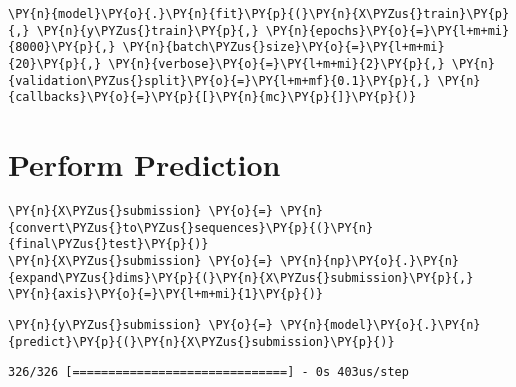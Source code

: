     \begin{tcolorbox}[breakable, size=fbox, boxrule=1pt, pad at break*=1mm,colback=cellbackground, colframe=cellborder]
\begin{Verbatim}[commandchars=\\\{\}]
\PY{n}{model}\PY{o}{.}\PY{n}{fit}\PY{p}{(}\PY{n}{X\PYZus{}train}\PY{p}{,} \PY{n}{y\PYZus{}train}\PY{p}{,} \PY{n}{epochs}\PY{o}{=}\PY{l+m+mi}{8000}\PY{p}{,} \PY{n}{batch\PYZus{}size}\PY{o}{=}\PY{l+m+mi}{20}\PY{p}{,} \PY{n}{verbose}\PY{o}{=}\PY{l+m+mi}{2}\PY{p}{,} \PY{n}{validation\PYZus{}split}\PY{o}{=}\PY{l+m+mf}{0.1}\PY{p}{,} \PY{n}{callbacks}\PY{o}{=}\PY{p}{[}\PY{n}{mc}\PY{p}{]}\PY{p}{)}
\end{Verbatim}
\end{tcolorbox}
        
    \hypertarget{perform-prediction}{%
\section{Perform Prediction}\label{perform-prediction}}

    \begin{tcolorbox}[breakable, size=fbox, boxrule=1pt, pad at break*=1mm,colback=cellbackground, colframe=cellborder]
\begin{Verbatim}[commandchars=\\\{\}]
\PY{n}{X\PYZus{}submission} \PY{o}{=} \PY{n}{convert\PYZus{}to\PYZus{}sequences}\PY{p}{(}\PY{n}{final\PYZus{}test}\PY{p}{)}
\PY{n}{X\PYZus{}submission} \PY{o}{=} \PY{n}{np}\PY{o}{.}\PY{n}{expand\PYZus{}dims}\PY{p}{(}\PY{n}{X\PYZus{}submission}\PY{p}{,} \PY{n}{axis}\PY{o}{=}\PY{l+m+mi}{1}\PY{p}{)}
\end{Verbatim}
\end{tcolorbox}

    \begin{tcolorbox}[breakable, size=fbox, boxrule=1pt, pad at break*=1mm,colback=cellbackground, colframe=cellborder]
\begin{Verbatim}[commandchars=\\\{\}]
\PY{n}{y\PYZus{}submission} \PY{o}{=} \PY{n}{model}\PY{o}{.}\PY{n}{predict}\PY{p}{(}\PY{n}{X\PYZus{}submission}\PY{p}{)}
\end{Verbatim}
\end{tcolorbox}

    \begin{Verbatim}[commandchars=\\\{\}]
326/326 [==============================] - 0s 403us/step
    \end{Verbatim}

